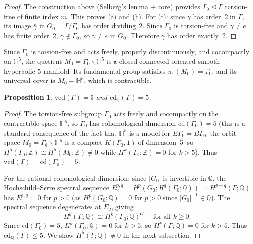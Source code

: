 \documentclass[12pt]{article}
\newtheorem{proposition}[theorem]{Proposition}
\theoremstyle{definition}
\theoremstyle{remark}
\begin{document}
\begin{proof}
The construction above (Selberg's lemma + core) provides $\Gamma_0 \unlhd \Gamma$
torsion-free of finite index $m$. This proves (a) and (b). For (c): since $\gamma$
has order~2 in $\Gamma$, its image $\bar\gamma$ in $G_0 = \Gamma/\Gamma_0$ has order
dividing~2. Since $\Gamma_0$ is torsion-free and $\gamma \neq e$ has finite order~2,
$\gamma \notin \Gamma_0$, so $\bar\gamma \neq e$ in $G_0$. Therefore $\bar\gamma$ has
order exactly~2.
\end{proof}

Since $\Gamma_0$ is torsion-free and acts freely, properly discontinuously, and
cocompactly on $\mathbb{H}^5$, the quotient $M_0 = \Gamma_0 \backslash \mathbb{H}^5$ is a
closed connected oriented smooth hyperbolic 5-manifold.  Its fundamental group satisfies
$\pi_1(M_0) = \Gamma_0$, and its universal cover is $\widetilde{M_0} = \mathbb{H}^5$,
which is contractible.

\begin{proposition}
\label{prop:vcd}
$\mathrm{vcd}(\Gamma) = 5$ and $\mathrm{cd}_{\mathbb{Q}}(\Gamma) = 5$.
\end{proposition}

\begin{proof}
The torsion-free subgroup $\Gamma_0$ acts freely and cocompactly on the contractible
space $\mathbb{H}^5$, so $\Gamma_0$ has cohomological dimension $\mathrm{cd}(\Gamma_0) = 5$
(this is a standard consequence of the fact that $\mathbb{H}^5$ is a model for
$E\Gamma_0 = B\Gamma_0$: the orbit space $M_0 = \Gamma_0\backslash\mathbb{H}^5$ is a
compact $K(\Gamma_0,1)$ of dimension~5, so
$H^5(\Gamma_0;\mathbb{Z}) \cong H^5(M_0;\mathbb{Z}) \neq 0$ while $H^k(\Gamma_0;\mathbb{Z}) = 0$
for $k > 5$). Thus $\mathrm{vcd}(\Gamma) = \mathrm{cd}(\Gamma_0) = 5$.

For the rational cohomological dimension: since $|G_0|$ is invertible in $\mathbb{Q}$,
the Hochschild--Serre spectral sequence
$E_2^{p,q} = H^p(G_0; H^q(\Gamma_0;\mathbb{Q})) \Rightarrow H^{p+q}(\Gamma;\mathbb{Q})$
has $E_2^{p,q} = 0$ for $p > 0$ (as $H^p(G_0;\mathbb{Q}) = 0$ for $p > 0$ since
$|G_0|^{-1} \in \mathbb{Q}$). The spectral sequence degenerates at $E_2$, giving
\begin{equation}
  \label{eq:HSSS}
  H^k(\Gamma;\mathbb{Q}) \cong H^k(\Gamma_0;\mathbb{Q})^{G_0} \quad \text{for all } k\geq 0.
\end{equation}
Since $\mathrm{cd}(\Gamma_0) = 5$, $H^k(\Gamma_0;\mathbb{Q}) = 0$ for $k > 5$, so
$H^k(\Gamma;\mathbb{Q}) = 0$ for $k > 5$. Thus $\mathrm{cd}_\mathbb{Q}(\Gamma) \leq 5$.
We show $H^5(\Gamma;\mathbb{Q}) \neq 0$ in the next subsection.
\end{proof}
\end{document}
